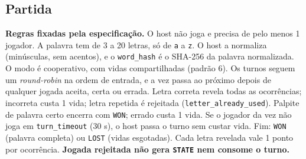 \documentclass[11pt,a4paper]{article}
\begin{document}
\subsection{Partida}
\textbf{Regras fixadas pela especificação.} O host não joga e precisa de pelo menos 1 jogador. A palavra tem de 3 a 20 letras, só de \texttt{a} a \texttt{z}. O host a normaliza (minúsculas, sem acentos), e o \texttt{word\_hash} é o SHA-256 da palavra normalizada. O modo é cooperativo, com vidas compartilhadas (padrão 6). Os turnos seguem um \emph{round-robin} na ordem de entrada, e a vez passa ao próximo depois de qualquer jogada aceita, certa ou errada. Letra correta revela todas as ocorrências; incorreta custa 1 vida; letra repetida é rejeitada (\texttt{letter\_already\_used}). Palpite de palavra certo encerra com \texttt{WON}; errado custa 1 vida. Se o jogador da vez não joga em \texttt{turn\_timeout} (30 s), o host passa o turno sem custar vida. Fim: \texttt{WON} (palavra completa) ou \texttt{LOST} (vidas esgotadas). Cada letra revelada vale 1 ponto por ocorrência. \textbf{Jogada rejeitada não gera \texttt{STATE} nem consome o turno.}
\end{document}
